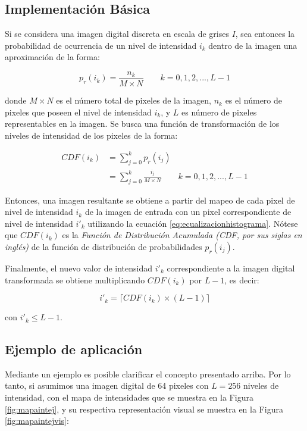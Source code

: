 \subsection{Implementación Básica}

Si se considera una imagen digital discreta en escala de grises $I$, sea entonces la probabilidad de ocurrencia de un nivel de intensidad $i_k$ dentro de la imagen una aproximación de la forma:

\begin{equation}
p_r(i_k)= \frac{n_k}{M \times N} \qquad k=0,1,2,...,L-1
\end{equation}

donde $M \times N$ es el número total de pixeles de la imagen, $n_k$ es el número de pixeles que poseen el nivel de intensidad $i_k$, y $L$ es número de pixeles representables en la imagen. Se busca una función de transformación de los niveles de intensidad de los pixeles de la forma:

\begin{equation}
\begin{split}
CDF(i_k) & = \sum_{j=0}^k p_r(i_j) \\
& = \sum_{j=0}^k \frac{i_j}{M \times N} \qquad k=0,1,2,...,L-1
\end{split}
\label{eq:ecualizacionhistograma}
\end{equation}

Entonces, una imagen resultante se obtiene a partir del mapeo de cada pixel de nivel de intensidad $i_k$ de la imagen de entrada con un pixel correspondiente de nivel de intensidad $i'_k$ utilizando la ecuación \ref{eq:ecualizacionhistograma}. Nótese que $CDF(i_k)$ es la \textit{Función de Distribución Acumulada (CDF, por sus siglas en inglés)} de la función de distribución de probabilidades $p_r(i_j)$.

Finalmente, el nuevo valor de intensidad $i'_k$ correspondiente a la imagen digital transformada se obtiene multiplicando $CDF(i_k)$ por $L-1$, es decir:

\begin{equation}
i'_k = \lceil CDF(i_k) \times (L-1)\rceil
\end{equation}

con $i'_k \leq L-1$.

\subsection{Ejemplo de aplicación}

Mediante un ejemplo es posible clarificar el concepto presentado arriba. Por lo tanto, si asumimos una imagen digital de 64 pixeles con $L=256$ niveles de intensidad, con el mapa de intensidades que se muestra en la Figura \ref{fig:mapaintej}, y su respectiva representación visual se muestra en la Figura \ref{fig:mapaintejvis}:

